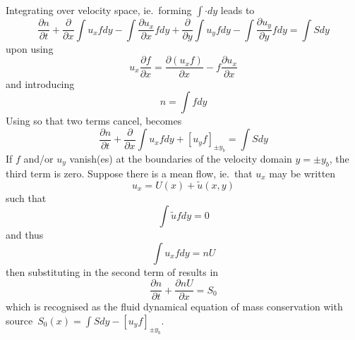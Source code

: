 Integrating  over velocity space, ie.\ forming $\int \cdot dy$ leads to
\begin{equation}\label{eq:nconkin}
 \frac{\partial n}{\partial t}  +  \frac{\partial}{\partial x} \int u_x f dy- \int \frac{\partial u_x}{\partial x} f dy+  \frac{\partial}{\partial y} \int u_y f dy- \int \frac{\partial u_y}{\partial y} f dy= \int S dy
\end{equation}
upon using 
\begin{equation}
u_x  \frac{\partial f}{\partial x} =  \frac{\partial  (u_x f)}{\partial x} -  f  \frac{\partial u_x}{\partial x}
\end{equation}
and introducing
\begin{equation}
n = \int f dy
\end{equation}
Using  so that two terms cancel,  becomes
\begin{equation}\label{eq:nconsimp}
 \frac{\partial n}{\partial t}  +  \frac{\partial}{\partial x} \int u_x f dy+  [  u_y f ]_{\pm y_b} = \int S dy
\end{equation}
If $f$ and/or $u_y$ vanish(es) at the boundaries of the velocity domain $y=\pm y_b$, the third term is zero.
Suppose there is a mean flow, ie.\ that $u_x$ may be written 
\begin{equation}\label{eq:usplit}
u_x = U(x) + \tilde{u} (x,y)
\end{equation}
such that 
\begin{equation}\label{eq:zeromean}
\int \tilde{u} f dy=0
\end{equation}
and thus
\begin{equation}\label{eq:usplitf}
\int u_x f dy  = n U
\end{equation}
then substituting  in the second term of  results  in
\begin{equation}\label{eq:masscon}
 \frac{\partial n}{\partial t}  +  \frac{\partial  nU}{\partial x} = S_0
\end{equation}
which is recognised as the fluid dynamical equation of mass conservation with
source~$S_0(x)= \int S dy-[  u_y f ]_{\pm y_b}$.

